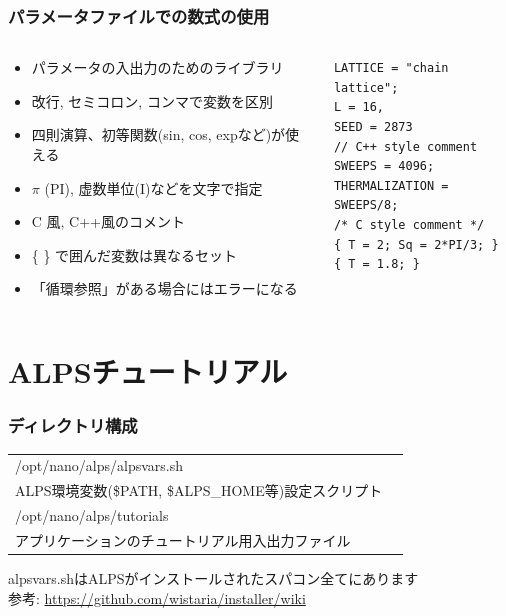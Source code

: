 \begin{frame}[t,fragile]
  \frametitle{パラメータファイルでの数式の使用}
  \begin{columns}[T]
    \begin{column}{.5\textwidth}
      \begin{itemize}
      \item パラメータの入出力のためのライブラリ
        \item 改行, セミコロン, コンマで変数を区別
        \item 四則演算、初等関数(sin, cos, expなど)が使える
        \item $\pi$ (PI), 虚数単位(I)などを文字で指定
        \item C 風, C++風のコメント
        \item \{ \} で囲んだ変数は異なるセット
        \item 「循環参照」がある場合にはエラーになる
      \end{itemize}
    \end{column}
    \begin{column}{.5\textwidth}
    \begin{lstlisting}
LATTICE = "chain lattice";
L = 16,
SEED = 2873
// C++ style comment
SWEEPS = 4096;
THERMALIZATION = SWEEPS/8;
/* C style comment */
{ T = 2; Sq = 2*PI/3; }
{ T = 1.8; }
    \end{lstlisting}
    \end{column}
  \end{columns}
\end{frame}

\section{ALPSチュートリアル}

\begin{frame}
  \frametitle{ディレクトリ構成}
  \begin{tabular}{ll}
    /opt/nano/alps/alpsvars.sh & \\
    \hspace*{3em} ALPS環境変数(\$PATH, \$ALPS\_HOME等)設定スクリプト \\
    /opt/nano/alps/tutorials & \\
    \hspace*{3em} アプリケーションのチュートリアル用入出力ファイル %
  \end{tabular}
  \begin{alertblock}{}
    alpsvars.shはALPSがインストールされたスパコン全てにあります \\
    参考: {\footnotesize \url{https://github.com/wistaria/installer/wiki}}
\end{alertblock}
\end{frame}

